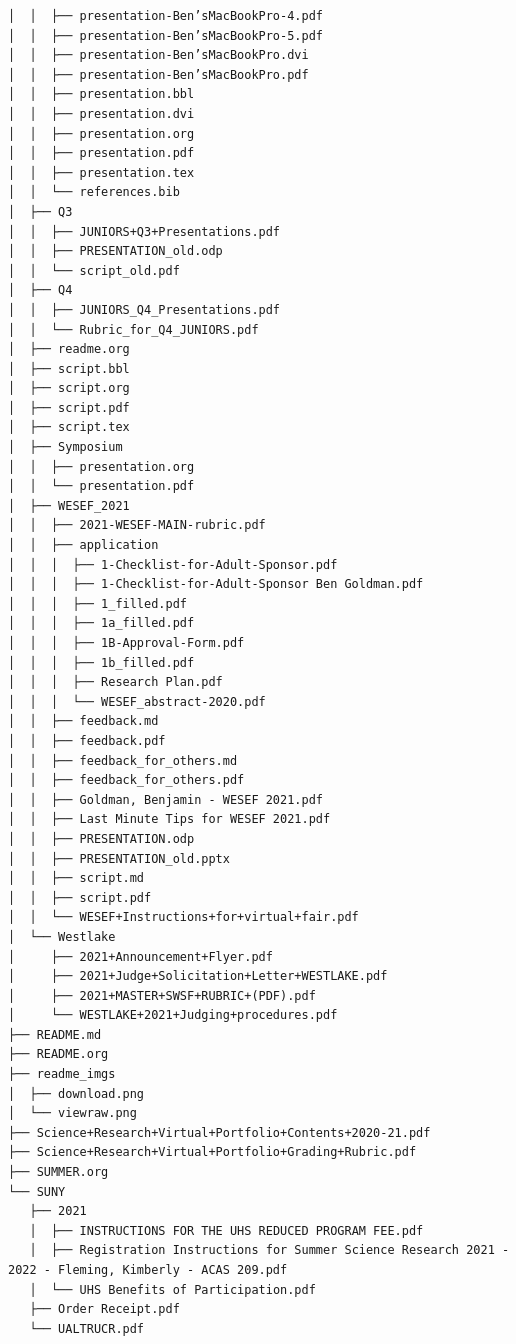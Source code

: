 \documentclass[11pt]{article}
\begin{document}
\begin{verbatim}
│  │  ├── presentation-Ben’sMacBookPro-4.pdf
│  │  ├── presentation-Ben’sMacBookPro-5.pdf
│  │  ├── presentation-Ben’sMacBookPro.dvi
│  │  ├── presentation-Ben’sMacBookPro.pdf
│  │  ├── presentation.bbl
│  │  ├── presentation.dvi
│  │  ├── presentation.org
│  │  ├── presentation.pdf
│  │  ├── presentation.tex
│  │  └── references.bib
│  ├── Q3
│  │  ├── JUNIORS+Q3+Presentations.pdf
│  │  ├── PRESENTATION_old.odp
│  │  └── script_old.pdf
│  ├── Q4
│  │  ├── JUNIORS_Q4_Presentations.pdf
│  │  └── Rubric_for_Q4_JUNIORS.pdf
│  ├── readme.org
│  ├── script.bbl
│  ├── script.org
│  ├── script.pdf
│  ├── script.tex
│  ├── Symposium
│  │  ├── presentation.org
│  │  └── presentation.pdf
│  ├── WESEF_2021
│  │  ├── 2021-WESEF-MAIN-rubric.pdf
│  │  ├── application
│  │  │  ├── 1-Checklist-for-Adult-Sponsor.pdf
│  │  │  ├── 1-Checklist-for-Adult-Sponsor Ben Goldman.pdf
│  │  │  ├── 1_filled.pdf
│  │  │  ├── 1a_filled.pdf
│  │  │  ├── 1B-Approval-Form.pdf
│  │  │  ├── 1b_filled.pdf
│  │  │  ├── Research Plan.pdf
│  │  │  └── WESEF_abstract-2020.pdf
│  │  ├── feedback.md
│  │  ├── feedback.pdf
│  │  ├── feedback_for_others.md
│  │  ├── feedback_for_others.pdf
│  │  ├── Goldman, Benjamin - WESEF 2021.pdf
│  │  ├── Last Minute Tips for WESEF 2021.pdf
│  │  ├── PRESENTATION.odp
│  │  ├── PRESENTATION_old.pptx
│  │  ├── script.md
│  │  ├── script.pdf
│  │  └── WESEF+Instructions+for+virtual+fair.pdf
│  └── Westlake
│     ├── 2021+Announcement+Flyer.pdf
│     ├── 2021+Judge+Solicitation+Letter+WESTLAKE.pdf
│     ├── 2021+MASTER+SWSF+RUBRIC+(PDF).pdf
│     └── WESTLAKE+2021+Judging+procedures.pdf
├── README.md
├── README.org
├── readme_imgs
│  ├── download.png
│  └── viewraw.png
├── Science+Research+Virtual+Portfolio+Contents+2020-21.pdf
├── Science+Research+Virtual+Portfolio+Grading+Rubric.pdf
├── SUMMER.org
└── SUNY
   ├── 2021
   │  ├── INSTRUCTIONS FOR THE UHS REDUCED PROGRAM FEE.pdf
   │  ├── Registration Instructions for Summer Science Research 2021 - 2022 - Fleming, Kimberly - ACAS 209.pdf
   │  └── UHS Benefits of Participation.pdf
   ├── Order Receipt.pdf
   └── UALTRUCR.pdf

\end{verbatim}
\end{document}

